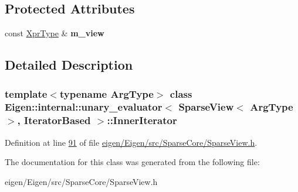 \subsection*{Protected Attributes}
\begin{DoxyCompactItemize}
\item 
\mbox{\label{class_eigen_1_1internal_1_1unary__evaluator_3_01_sparse_view_3_01_arg_type_01_4_00_01_iterator_based_01_4_1_1_inner_iterator_ab5126a2d03ca0675754edf3e07c8acd4}} 
const \hyperlink{group___sparse_core___module_class_eigen_1_1_sparse_view}{Xpr\+Type} \& {\bfseries m\+\_\+view}
\end{DoxyCompactItemize}


\subsection{Detailed Description}
\subsubsection*{template$<$typename Arg\+Type$>$\newline
class Eigen\+::internal\+::unary\+\_\+evaluator$<$ Sparse\+View$<$ Arg\+Type $>$, Iterator\+Based $>$\+::\+Inner\+Iterator}



Definition at line \hyperlink{eigen_2_eigen_2src_2_sparse_core_2_sparse_view_8h_source_l00091}{91} of file \hyperlink{eigen_2_eigen_2src_2_sparse_core_2_sparse_view_8h_source}{eigen/\+Eigen/src/\+Sparse\+Core/\+Sparse\+View.\+h}.



The documentation for this class was generated from the following file\+:\begin{DoxyCompactItemize}
\item 
eigen/\+Eigen/src/\+Sparse\+Core/\+Sparse\+View.\+h\end{DoxyCompactItemize}
